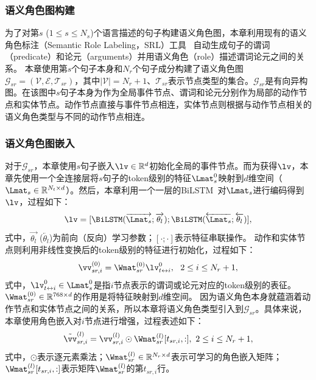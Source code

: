 \subsubsection{语义角色图构建}
为了对第$s$ ($1 \le s \le N_s$)个语言描述的句子构建语义角色图，本章利用现有的语义角色标注（Semantic Role Labeling，SRL）工具~\cite{shi2019simple} 自动生成句子的谓词 （predicate）和论元（arguments）并用语义角色（role）描述谓词论元之间的关系。
本章使用第$s$个句子本身和$N_r$个句子成分构建了语义角色图$\mathcal{G}_{sr}=(\mathcal{V}, \mathcal{E}, \mathcal{T}_{sr})$，其中$|\mathcal{V}|=N_r + 1$、$\mathcal{T}_{sr}$表示节点类型的集合。$\mathcal{G}_{sr}$是有向异构图。在该图中$s$句子本身为作为全局事件节点、谓词和论元分别作为局部的动作节点和实体节点。动作节点直接与事件节点相连，实体节点则根据与动作节点相关的语义角色类型与不同的动作节点相连。

\subsubsection{语义角色图嵌入}
对于$\mathcal{G}_{sr}$，本章使用$s$句子嵌入$\lv \in \mathbb{R}^{d}$初始化全局的事件节点。而为获得$\lv$，本章先使用一个全连接层将$s$句子的token级别的特征$\Lmat_s^{0}$映射到$d$维空间（$\Lmat_s\in \mathbb{R}^{N_t \times d}$）。然后，本章利用一个一层的BiLSTM~\cite{hochreiter1997long}对$\Lmat_s$进行编码得到$\lv$，过程如下：
\begin{equation}
\begin{aligned} 
\lv = [\BiLSTM(\overrightarrow{\Lmat_s}; \overrightarrow{\theta_l}); \BiLSTM(\overleftarrow{\Lmat_s}; \overleftarrow{\theta_l})], 
\label{eq:gse_bilstm}
\end{aligned}
\end{equation}
式中，$\overrightarrow{\theta_l}$ ($\overleftarrow{\theta_l}$)为前向（反向）学习参数；$[\cdot; \cdot]$表示特征串联操作。
动作和实体节点则利用非线性变换后的token级别的特征进行初始化，过程如下：
\begin{equation} 
\vv_{sr, i}^{(0)} = \Wmat_{sr}^{(0)} \lv_{t \leftrightarrow i}^{0}, ~~2 \le i \le N_r + 1, 
\end{equation} 
式中，$\lv_{t \leftrightarrow i}^{0} \in \Lmat_s^{0}$是指$i$节点表示的谓词或论元对应的token级别的表征。$\Wmat_{sr}^{(0)}\in \mathbb{R}^{\text{768} \times d}$的作用是将特征映射到$d$维空间。
因为语义角色本身就蕴涵着动作节点和实体节点之间的关系，所以本章将语义角色类型引入到$\mathcal{G}_{sr}$。具体来说，本章使用角色嵌入对$i$节点进行增强，过程表述如下：
\begin{equation}
\tilde{\vv}_{sr,i}^{(l)} = \vv_{sr,i}^{(l)} \odot \Wmat_{sr}^{(l)}[t_{sr, i}, :], ~2 \le i \le N_r + 1, 
\end{equation}
式中，$\odot$表示逐元素乘法；$\Wmat_{sr}^{(l)} \in \mathbb{R}^{N_r \times d}$表示可学习的角色嵌入矩阵；$\Wmat_{sr}^{(l)}[t_{sr, i}, :]$表示矩阵$\Wmat_{sr}^{(l)}$的第$t_{sr, i}$行。



